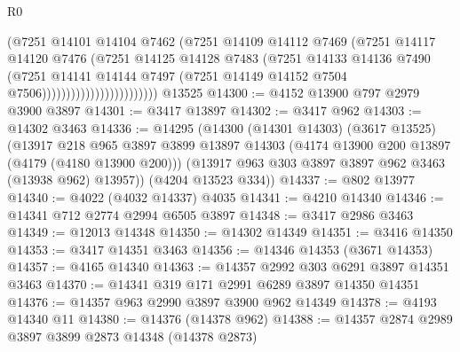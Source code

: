 \begin{lexlean}{R0}
\begin{coremodule}
                                      (@7251
                                        @14101
                                        @14104
                                        @7462
                                        (@7251
                                          @14109
                                          @14112
                                          @7469
                                          (@7251
                                            @14117
                                            @14120
                                            @7476
                                            (@7251
                                              @14125
                                              @14128
                                              @7483
                                              (@7251
                                                @14133
                                                @14136
                                                @7490
                                                (@7251
                                                  @14141
                                                  @14144
                                                  @7497
                                                  (@7251
                                                    @14149
                                                    @14152
                                                    @7504
                                                    @7506))))))))))))))))))))))))
    @13525
@14300 := @4152 @13900 @797 @2979 @3900 @3897
@14301 := @3417 @13897
@14302 := @3417 @962
@14303 := @14302 @3463
@14336 := @14295
    (@14300
      (@14301 @14303)
      (@3617 @13525)
      (@13917
        @218
        @965
        @3897
        @3899
        @13897
        @14303
        (@4174 @13900 @200 @13897 (@4179 (@4180 @13900 @200)))
        (@13917 @963 @303 @3897 @3897 @962 @3463 (@13938 @962) @13957))
      (@4204 @13523 @334))
@14337 := @802 @13977
@14340 := @4022 (@4032 @14337) @4035
@14341 := @4210 @14340
@14346 := @14341 @712 @2774 @2994 @6505 @3897
@14348 := @3417 @2986 @3463
@14349 := @12013 @14348
@14350 := @14302 @14349
@14351 := @3416 @14350
@14353 := @3417 @14351 @3463
@14356 := @14346 @14353 (@3671 @14353)
@14357 := @4165 @14340
@14363 := @14357 @2992 @303 @6291 @3897 @14351 @3463
@14370 := @14341 @319 @171 @2991 @6289 @3897 @14350 @14351
@14376 := @14357 @963 @2990 @3897 @3900 @962 @14349
@14378 := @4193 @14340 @11
@14380 := @14376 (@14378 @962)
@14388 := @14357 @2874 @2989 @3897 @3899 @2873 @14348 (@14378 @2873)

\end{coremodule}
\end{lexlean}
